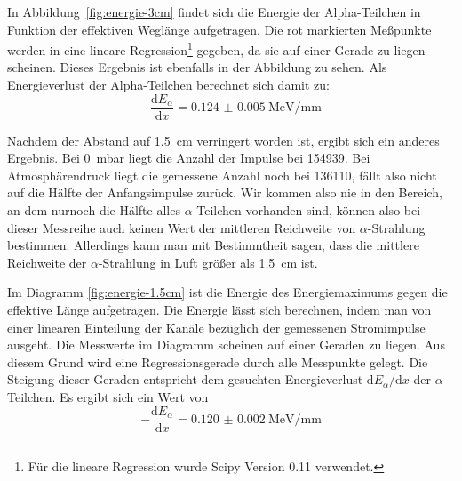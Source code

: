 In Abbildung~\ref{fig:energie-3cm} findet sich die Energie der
Alpha-Teilchen in Funktion der effektiven Weglänge aufgetragen. Die rot
markierten Meßpunkte werden in eine lineare Regression\footnote{Für die
 lineare Regression wurde Scipy Version 0.11 verwendet.}  gegeben, da
sie auf einer Gerade zu liegen scheinen. Dieses Ergebnis ist ebenfalls
in der Abbildung zu sehen. Als Energieverlust der Alpha-Teilchen
berechnet sich damit zu:
%
\begin{equation}
  \label{eq:energieverlust}
  -\frac{\mathrm{d}E_\alpha}{\mathrm{d}x} = 
  \SI{0.124(5)}{\mega\electronvolt\per\milli\metre}
\end{equation}

Nachdem der Abstand auf \SI{1.5}{\centi\metre} verringert worden ist,
ergibt sich ein anderes Ergebnis. Bei \SI{0}{\milli\bar} liegt die
Anzahl der Impulse bei 154939. Bei Atmosphärendruck liegt die gemessene
Anzahl noch bei 136110, fällt also nicht auf die Hälfte der
Anfangsimpulse zurück. Wir kommen also nie in den Bereich, an dem
nurnoch die Hälfte alles $\alpha$-Teilchen vorhanden sind, können also
bei dieser Messreihe auch keinen Wert der mittleren Reichweite von
$\alpha$-Strahlung bestimmen.  Allerdings kann man mit Bestimmtheit
sagen, dass die mittlere Reichweite der $\alpha$-Strahlung in Luft
größer als \SI{1.5}{\centi\metre} ist.

Im Diagramm \ref{fig:energie-1.5cm} ist die Energie des Energiemaximums
gegen die effektive Länge aufgetragen. Die Energie lässt sich berechnen,
indem man von einer linearen Einteilung der Kanäle bezüglich der
gemessenen Stromimpulse ausgeht. Die Messwerte im Diagramm scheinen auf
einer Geraden zu liegen. Aus diesem Grund wird eine Regressionsgerade
durch alle Messpunkte gelegt. Die Steigung dieser Geraden entspricht
dem gesuchten Energieverlust $\mathrm{d}E_\alpha/\mathrm{d}x$ der
$\alpha$-Teilchen. Es ergibt sich ein Wert von
%
\begin{equation}
  \label{eq:wert-energie-verlust-1.5cm}
  -\frac{\mathrm{d}E_\alpha}{\mathrm{d}x} = 
  \SI{0.120(2)}{\mega\electronvolt\per\milli\metre}
\end{equation}

